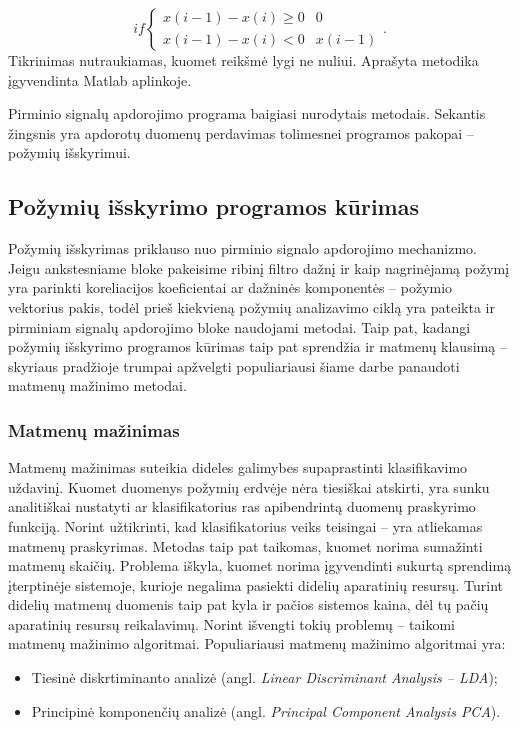 \documentclass[]{vgtuef}
\begin{document}
\begin{equation}
	if \left\{ \begin{array}{ll}
	x(i-1) - x(i) \geq 0 & 0 \\
	x(i-1) - x(i) < 0 & x(i-1)
	\end{array} \right..
\end{equation}
Tikrinimas nutraukiamas, kuomet reikšmė lygi ne nuliui. Aprašyta metodika įgyvendinta Matlab aplinkoje.

Pirminio signalų apdorojimo programa baigiasi nurodytais metodais. Sekantis žingsnis yra apdorotų duomenų perdavimas tolimesnei programos pakopai -- požymių išskyrimui.

\subsection{Požymių išskyrimo programos kūrimas}

Požymių išskyrimas priklauso nuo pirminio signalo apdorojimo mechanizmo. Jeigu ankstesniame bloke pakeisime ribinį filtro dažnį ir kaip nagrinėjamą požymį yra parinkti koreliacijos koeficientai ar dažninės komponentės -- požymio vektorius pakis, todėl prieš kiekvieną požymių analizavimo ciklą yra pateikta ir pirminiam signalų apdorojimo bloke naudojami metodai. Taip pat, kadangi požymių išskyrimo programos kūrimas taip pat sprendžia ir matmenų klausimą -- skyriaus pradžioje trumpai apžvelgti populiariausi šiame darbe panaudoti matmenų mažinimo metodai.

\subsubsection{Matmenų mažinimas}

Matmenų mažinimas suteikia dideles galimybes supaprastinti klasifikavimo uždavinį. Kuomet duomenys požymių erdvėje nėra tiesiškai atskirti, yra sunku analitiškai nustatyti ar klasifikatorius ras apibendrintą duomenų praskyrimo funkciją. Norint užtikrinti, kad klasifikatorius veiks teisingai -- yra atliekamas matmenų praskyrimas. Metodas taip pat taikomas, kuomet norima sumažinti matmenų skaičių. Problema iškyla, kuomet norima įgyvendinti sukurtą sprendimą įterptinėje sistemoje, kurioje negalima pasiekti didelių aparatinių resursų. Turint didelių matmenų duomenis taip pat kyla ir pačios sistemos kaina, dėl tų pačių aparatinių resursų reikalavimų. Norint išvengti tokių problemų -- taikomi matmenų mažinimo algoritmai. Populiariausi matmenų mažinimo algoritmai yra:

\begin{itemize}
\item Tiesinė diskrtiminanto analizė (angl. \textit{Linear Discriminant Analysis -- LDA});
\item Principinė komponenčių analizė (angl. \textit{Principal Component Analysis PCA}).
\end{itemize}
\end{document}
